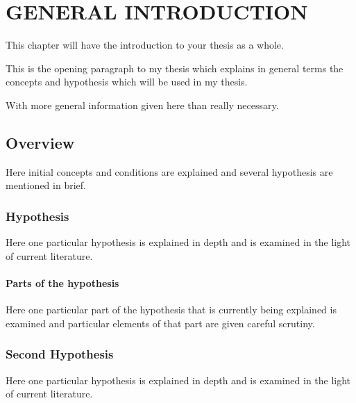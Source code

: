 \chapter{GENERAL INTRODUCTION}
This chapter will have the introduction to your thesis as a whole.

This is the opening paragraph to my thesis which
explains in general terms the concepts and hypothesis
which will be used in my thesis.

With more general information given here than really
necessary.

\section{Overview}

Here initial concepts and conditions are explained and
several hypothesis are mentioned in brief.

\subsection{Hypothesis}

Here one particular hypothesis is explained in depth
and is examined in the light of current literature.

\subsubsection{Parts of the hypothesis}

Here one particular part of the hypothesis that is 
currently being explained is examined and particular
elements of that part are given careful scrutiny.


\subsection{Second Hypothesis}

Here one particular hypothesis is explained in depth
and is examined in the light of current literature.

